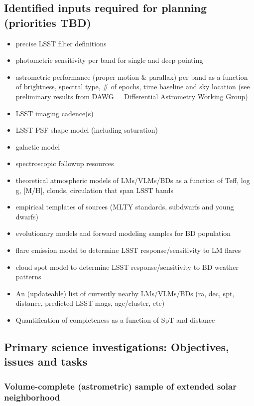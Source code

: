 \subsection{Identified inputs required for planning (priorities TBD)}
\begin{itemize}
\item{precise 
LSST filter definitions }
\item{photometric 
sensitivity per band for single and deep pointing }
\item{astrometric 
performance (proper motion \& parallax) per band as a function of 
brightness, spectral type, \# of epochs, time baseline and sky location (see preliminary 
results from DAWG = Differential Astrometry Working Group) }
\item{LSST 
imaging cadence(s) }
\item{LSST 
PSF shape model (including saturation) }
\item{galactic 
model }
\item{ spectroscopic 
followup resources }
\item{theoretical 
atmospheric models of LMs/VLMs/BDs as a function of {Teff, log g, [M/H], 
clouds, circulation} that span LSST bands }
\item{empirical 
templates of sources (MLTY standards, subdwarfs and young dwarfs) }
\item{evolutionary 
models and forward modeling samples for BD population }
\item{flare 
emission model to determine LSST response/sensitivity to LM flares }
\item{cloud 
spot model to determine LSST response/sensitivity to BD weather patterns }
\item{An 
(updateable) list of currently nearby LMs/VLMs/BDs (ra, dec, spt, distance, predicted 
LSST mags, age/cluster, etc) }
\item{Quantification 
of completeness as a function of SpT and distance }
\end{itemize}

\subsection{Primary science investigations: Objectives, issues and tasks}



\subsubsection{Volume-complete (astrometric) sample of extended solar neighborhood }

